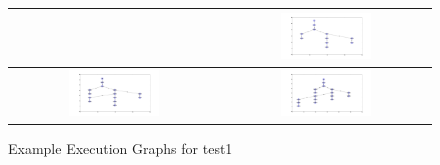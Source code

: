 \begin{figure}[ht]
\begin{tabular}{| c | c |}
   &\includegraphics[width=0.45\textwidth]{graphs/1_5}\\\hline
   \includegraphics[width=0.45\textwidth]{graphs/1_6}
   &\includegraphics[width=0.45\textwidth]{graphs/1_7}\\\hline
 \end{tabular}
 \caption{Example Execution Graphs for test1}
 \label{figure:examplegraphs}
\end{figure}

